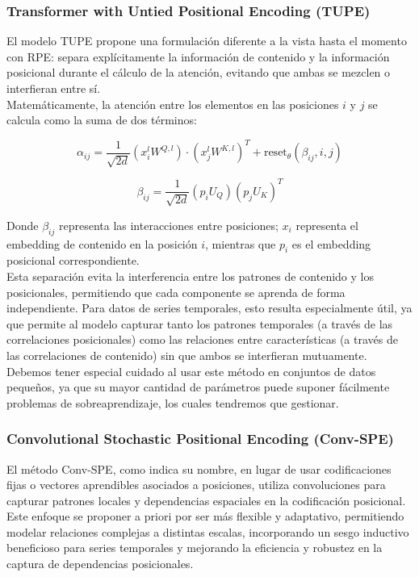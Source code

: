 \subsubsection{Transformer with Untied Positional Encoding (TUPE)}

El modelo TUPE propone una formulación diferente a la vista hasta el momento con RPE: separa explícitamente la información de contenido y la información posicional durante el cálculo de la atención, evitando que ambas se mezclen o interfieran entre sí.\\

Matemáticamente, la atención entre los elementos en las posiciones \(i\) y \(j\) se calcula como la suma de dos términos:

\begin{equation}
	\alpha_{ij} = \frac{1}{\sqrt{2d}} (x_i^l W^{Q,l})\cdot(x_j^l W^{K,l})^T + \mathrm{reset}_\theta(\beta_{ij}, i, j)
\end{equation}

\begin{equation}
	\beta_{ij} = \frac{1}{\sqrt{2d}} (p_i U_Q)(p_j U_K)^T
\end{equation}

Donde $\beta_{ij}$ representa las interacciones entre posiciones; \(x_i\) representa el embedding de contenido en la posición \(i\), mientras que \(p_i\) es el embedding posicional correspondiente.\\

Esta separación evita la interferencia entre los patrones de contenido y los posicionales, permitiendo que cada componente se aprenda de forma independiente. Para datos de series temporales, esto resulta especialmente útil, ya que permite al modelo capturar tanto los patrones temporales (a través de las correlaciones posicionales) como las relaciones entre características (a través de las correlaciones de contenido) sin que ambos se interfieran mutuamente.\\

Debemos tener especial cuidado al usar este método en conjuntos de datos pequeños, ya que su mayor cantidad de parámetros puede suponer fácilmente problemas de sobreaprendizaje, los cuales tendremos que gestionar.


\subsubsection{Convolutional Stochastic Positional Encoding (Conv-SPE)}

El método Conv-SPE, como indica su nombre, en lugar de usar codificaciones fijas o vectores aprendibles asociados a posiciones, utiliza convoluciones para capturar patrones locales y dependencias espaciales en la codificación posicional. Este enfoque se proponer a priori por ser más flexible y adaptativo, permitiendo modelar relaciones complejas a distintas escalas, incorporando un sesgo inductivo beneficioso para series temporales y mejorando la eficiencia y robustez en la captura de dependencias posicionales. \\

